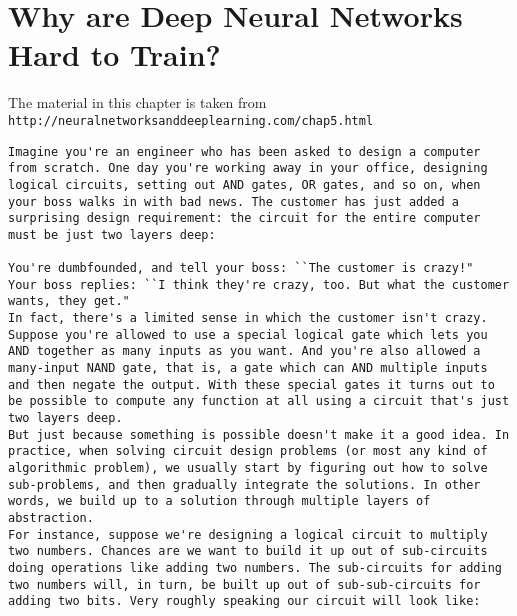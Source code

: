 \chapter{Why are Deep Neural Networks Hard to Train?}
\label{sec:WhyAreDeepNeuralNetworksHardToTrain?}


The material in this chapter is taken from\\
\lstinline{http://neuralnetworksanddeeplearning.com/chap5.html}





\begin{lstlisting}
Imagine you're an engineer who has been asked to design a computer from scratch. One day you're working away in your office, designing logical circuits, setting out AND gates, OR gates, and so on, when your boss walks in with bad news. The customer has just added a surprising design requirement: the circuit for the entire computer must be just two layers deep:

You're dumbfounded, and tell your boss: ``The customer is crazy!"
Your boss replies: ``I think they're crazy, too. But what the customer wants, they get."
In fact, there's a limited sense in which the customer isn't crazy. Suppose you're allowed to use a special logical gate which lets you AND together as many inputs as you want. And you're also allowed a many-input NAND gate, that is, a gate which can AND multiple inputs and then negate the output. With these special gates it turns out to be possible to compute any function at all using a circuit that's just two layers deep.
But just because something is possible doesn't make it a good idea. In practice, when solving circuit design problems (or most any kind of algorithmic problem), we usually start by figuring out how to solve sub-problems, and then gradually integrate the solutions. In other words, we build up to a solution through multiple layers of abstraction. 
For instance, suppose we're designing a logical circuit to multiply two numbers. Chances are we want to build it up out of sub-circuits doing operations like adding two numbers. The sub-circuits for adding two numbers will, in turn, be built up out of sub-sub-circuits for adding two bits. Very roughly speaking our circuit will look like:


\end{lstlisting}
